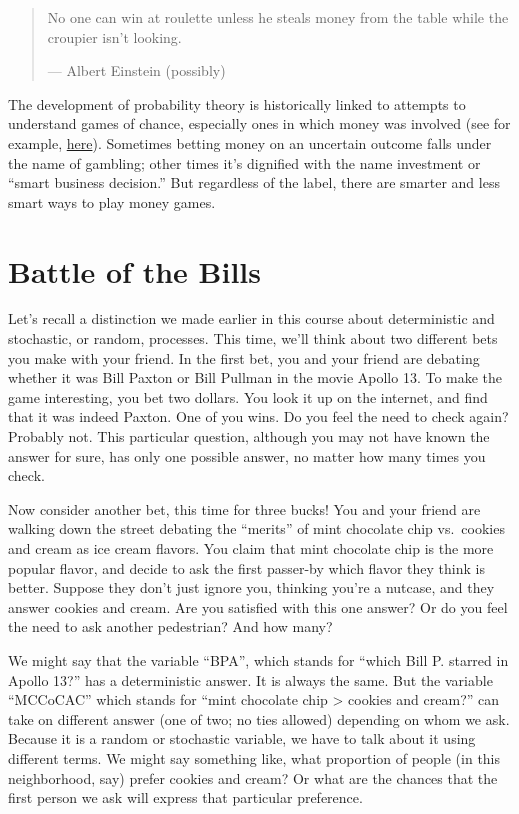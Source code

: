 \documentclass[
  openany]{book}
\begin{document}
\begin{quote}
No one can win at roulette unless he steals money from the table while the croupier isn't looking.

--- Albert Einstein (possibly)
\end{quote}

The development of probability theory is historically linked to attempts to understand games of chance, especially ones in which money was involved (see for example, \href{http://sites.math.rutgers.edu/~cherlin/History/Papers2000/cheng.html}{here}). Sometimes betting money on an uncertain outcome falls under the name of gambling; other times it's dignified with the name investment or ``smart business decision.'' But regardless of the label, there are smarter and less smart ways to play money games.

\hypertarget{battle-of-the-bills}{%
\section*{Battle of the Bills}\label{battle-of-the-bills}}

Let's recall a distinction we made earlier in this course about deterministic and stochastic, or random, processes. This time, we'll think about two different bets you make with your friend. In the first bet, you and your friend are debating whether it was Bill Paxton or Bill Pullman in the movie Apollo 13. To make the game interesting, you bet two dollars. You look it up on the internet, and find that it was indeed Paxton. One of you wins. Do you feel the need to check again? Probably not. This particular question, although you may not have known the answer for sure, has only one possible answer, no matter how many times you check.

Now consider another bet, this time for three bucks! You and your friend are walking down the street debating the ``merits'' of mint chocolate chip vs.~cookies and cream as ice cream flavors. You claim that mint chocolate chip is the more popular flavor, and decide to ask the first passer-by which flavor they think is better. Suppose they don't just ignore you, thinking you're a nutcase, and they answer cookies and cream. Are you satisfied with this one answer? Or do you feel the need to ask another pedestrian? And how many?

We might say that the variable ``BPA'', which stands for ``which Bill P. starred in Apollo 13?'' has a deterministic answer. It is always the same. But the variable ``MCCoCAC'' which stands for ``mint chocolate chip \textgreater{} cookies and cream?'' can take on different answer (one of two; no ties allowed) depending on whom we ask. Because it is a random or stochastic variable, we have to talk about it using different terms. We might say something like, what proportion of people (in this neighborhood, say) prefer cookies and cream? Or what are the chances that the first person we ask will express that particular preference.
\end{document}
